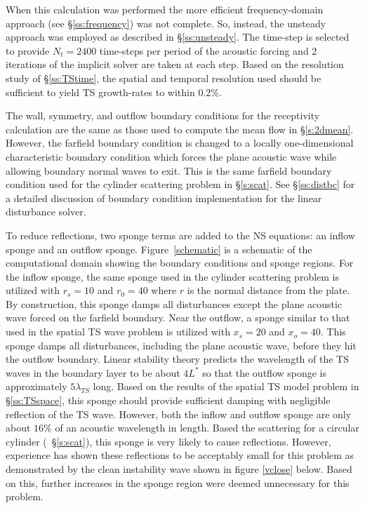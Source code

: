 When this calculation was performed the more efficient frequency-domain
approach (see \S\ref{ss:frequency}) was not complete.  So, instead, the
unsteady approach was employed as described in \S\ref{ss:unsteady}.  The
time-step is selected to provide $N_t=2400$ time-steps per period of the
acoustic forcing and 2 iterations of the implicit solver are taken at each
step.  Based on the resolution study of \S\ref{ss:TStime}, the spatial and
temporal resolution used should be sufficient to yield TS growth-rates to
within $0.2\%$.

The wall, symmetry, and outflow boundary conditions for the receptivity
calculation are the same as those used to compute the mean flow in
\S\ref{s:2dmean}.  However, the farfield boundary condition is changed to a
locally one-dimensional characteristic boundary condition \cite{Giles:90}
which forces the plane acoustic wave while allowing boundary normal waves to
exit.  This is the same farfield boundary condition used for the cylinder
scattering problem in \S\ref{s:scat}.  See \S\ref{ss:distbc} for a detailed
discussion of boundary condition implementation for the linear disturbance
solver.

To reduce reflections, two sponge terms are added to the NS equations: an
inflow sponge and an outflow sponge.  Figure~\ref{schematic} is a schematic of
the computational domain showing the boundary conditions and sponge regions.
For the inflow sponge, the same sponge used in the cylinder scattering problem
is utilized with $r_s=10$ and $r_0=40$ where $r$ is the normal distance from
the plate.  By construction, this sponge damps all disturbances except the
plane acoustic wave forced on the farfield boundary.  Near the outflow, a
sponge similar to that used in the spatial TS wave problem is utilized with
$x_s=20$ and $x_o=40$.  This sponge damps all disturbances, including the
plane acoustic wave, before they hit the outflow boundary.  Linear stability
theory predicts the wavelength of the TS waves in the boundary layer to be
about $4 L^*$ so that the outflow sponge is approximately $5\lambda_{TS}$
long.  Based on the results of the spatial TS model problem in
\S\ref{ss:TSspace}, this sponge should provide sufficient damping with
negligible reflection of the TS wave.  However, both the inflow and outflow
sponge are only about $16\%$ of an acoustic wavelength in length.  Based the
scattering for a circular cylinder (\eg\ \S\ref{s:scat}), this sponge is very
likely to cause reflections.  However, experience has shown these reflections
to be acceptably small for this problem as demonstrated by the clean
instability wave shown in figure \ref{vclose} below.  Based on this, further
increases in the sponge region were deemed unnecessary for this problem.
%
%

